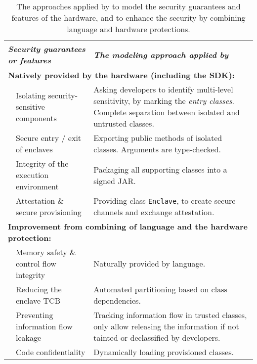 \begin{table*}[t!b!]
\centering
  \begin{tabular}{p{0.05in} >{\raggedright\arraybackslash}p{2.05in} >{\raggedright\arraybackslash}p{4.4in}}
  \toprule
  \multicolumn{2}{l}{\it Security guarantees or features} & {\it The modeling approach applied by \sysname{}} \\
  \midrule
  \midrule
  \multicolumn{3}{l}{\bf Natively provided by the \sgx{} hardware (including the SDK):} \\
  \midrule
  & Isolating security-sensitive components &
  Asking developers to identify multi-level sensitivity, by marking the {\em entry classes}. Complete separation between isolated and untrusted classes.
  \\
  \midrule
  & Secure entry / exit of enclaves &
  Exporting public methods of isolated classes. Arguments are type-checked.
  \\
  \midrule
  & Integrity of the execution environment & 
  Packaging all supporting classes into a signed JAR.
  \\
  \midrule
  & Attestation \& secure provisioning & 
  Providing class {\tt Enclave}, to create secure channels and exchange attestation.
  \\
  \midrule
  \midrule
  \multicolumn{3}{l}{\bf Improvement from combining of \java{} language and the \sgx{} hardware protection:} \\
  \midrule
  & Memory safety \& control flow integrity &
  Naturally provided by \java{} language.
  \\
  \midrule
  & Reducing the enclave TCB &
  Automated partitioning based on class dependencies.
  \\
  \midrule
  & Preventing information flow leakage &
  Tracking information flow in trusted classes, only allow releasing the information if not tainted or declassified by developers.
  \\
  \midrule
  & Code confidentiality & Dynamically loading provisioned classes.
  \\
  \end{tabular}
  
\footnotesize
\caption{
The approaches applied by \sysname{} to model the security guarantees and features of the \sgx{} hardware, and to enhance the security by combining language and hardware protections.
}
\label{tab:features}
\end{table*}
